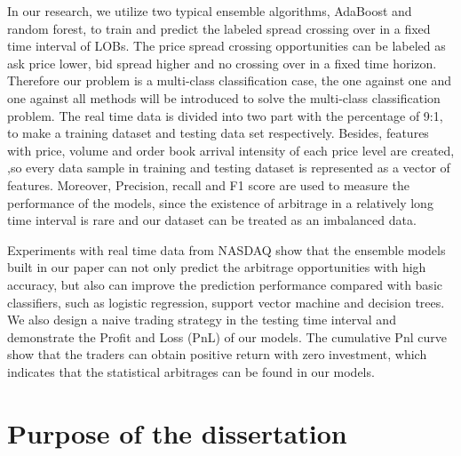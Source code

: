 In our research, we utilize two typical ensemble algorithms, AdaBoost and random forest, to train and predict the labeled spread crossing over in a fixed time interval of LOBs. The price spread crossing opportunities can be labeled as ask price lower, bid spread higher and no crossing over in a fixed time horizon. Therefore our problem is a multi-class classification case, the one against one and one against all methods will be introduced to solve the multi-class classification problem. The real time data is divided into two part with the percentage of 9:1, to make a training dataset and testing data set respectively. Besides, features with price, volume and order book arrival intensity of each price level are created, ,so every data sample in training and testing dataset is represented as a vector of features. Moreover, Precision, recall and F1 score  are used to measure the performance of the models, since the existence of arbitrage in a relatively long time interval is rare and our dataset can be treated as an imbalanced data.  

Experiments with real time data from NASDAQ show that the ensemble models built in our paper can not only predict the arbitrage opportunities with high accuracy, but also can improve the prediction performance compared with basic classifiers, such as logistic regression, support vector machine and decision trees. We also design a naive trading strategy in the testing time interval and demonstrate the Profit and Loss (PnL) of our models. The cumulative Pnl curve show that the traders can obtain positive return with zero investment, which indicates that the statistical arbitrages can be found in our models.
\begin{center}
\end{center}
\section{Purpose of the dissertation}

